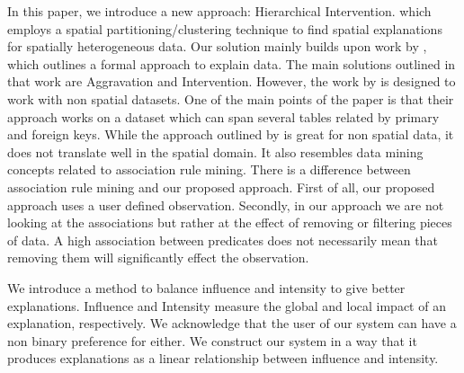 
In this paper, we introduce a new approach: Hierarchical Intervention. which employs a spatial partitioning/clustering technique to find spatial explanations for spatially heterogeneous data. Our solution mainly builds upon work by \cite{roy2014formal}, which outlines a formal approach to explain data. The main solutions outlined in that work are Aggravation and Intervention. However, the work by \cite{roy2014formal} is designed to work with non spatial datasets. One of the main points of the paper is that their approach works on a dataset which can span several tables related by primary and foreign keys. While the approach outlined by \cite{roy2014formal} is great for non spatial data, it does not translate well in the spatial domain. 
It also resembles data mining concepts related to association rule mining\cite{agarwal1994fast,tan2006introduction}. 
There is a difference between association rule mining and our proposed approach. First of all, our proposed approach uses a user defined observation. Secondly, in our approach we are not looking at the associations but rather at the effect of removing or filtering pieces of data. A high association between predicates does not necessarily mean that removing them will significantly effect the observation.


We introduce a method to balance influence and intensity to give better explanations. Influence and Intensity measure the global and local impact of an explanation, respectively. We acknowledge that the user of our system can have a non binary preference for either. We construct our system in a way that it produces explanations as a linear relationship between influence and intensity.


